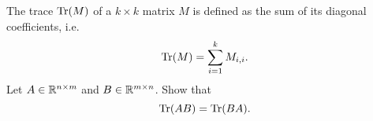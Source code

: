 \documentclass[11pt,nocut]{article}
\begin{document}
\begin{problem}[$\star$]
	The trace ${{\rm Tr}}(M)$ of a $k \times k$ matrix $M$ is defined as the sum of its diagonal coefficients, i.e.
	$$
	{{\rm Tr}}(M) = \sum_{i=1}^k M_{i,i}.
	$$
	Let $A \in \mathbb{R}^{n \times m}$ and $B \in \mathbb{R}^{m \times n}$. Show that
	$$
	{{\rm Tr}}(AB) = {{\rm Tr}}(BA).
	$$
\end{problem}
\vspace{1cm}
\centerline{}

%
%
\end{document}
